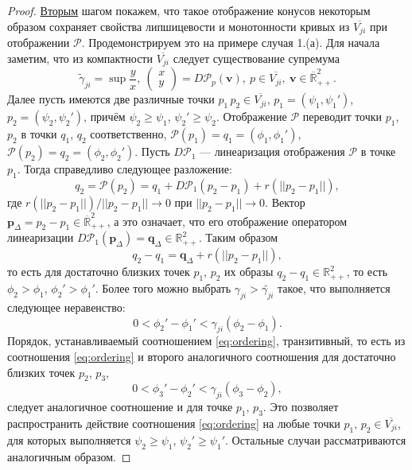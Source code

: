 \documentclass{article}
\begin{document}
\begin{proof}
\underline{Вторым} шагом покажем, что такое отображение конусов некоторым образом сохраняет свойства липшицевости и монотонности кривых из $\overline{V_{ji}}$ при отображении $\mathcal{P}$.
Продемонстрируем это на примере случая 1.(а).
Для начала заметим, что из компактности $\overline{V_{ji}}$ следует существование супремума
\begin{equation*}
	\widetilde{\gamma}_{ji} = \sup \dfrac{y}{x}, \ \begin{pmatrix} x \\ y \end{pmatrix} = D \mathcal{P}_p (\mathbf{v}), \ p \in \overline{V_{ji}}, \ \mathbf{v} \in \overline{\mathbb{R}}_{++}^2.
\end{equation*}
Далее пусть имеются две различные точки $p_1 \, p_2 \in \overline{V_{ji}}$, $p_1 = (\psi_1, \psi_1')$, $p_2 = (\psi_2, \psi_2')$, причём $\psi_2 \ge \psi_1$, $\psi_2' \ge \psi_2$.
Отображение $\mathcal{P}$ переводит точки $p_1$, $p_2$ в точки $q_1$, $q_2$ соответственно, $\mathcal{P}(p_1) = q_1 = (\phi_1, \phi_1')$, $\mathcal{P}(p_2) = q_2 = (\phi_2, \phi_2')$.
Пусть $D \mathcal{P}_1$ --- линеаризация отображения $\mathcal{P}$ в точке $p_1$.
Тогда справедливо следующее разложение:
\begin{equation}
	q_2 = \mathcal{P}(p_2) = q_1 + D \mathcal{P}_1 (p_2 - p_1) + r(||p_2 - p_1||),
\end{equation}
где $r(||p_2 - p_1||) / ||p_2 - p_1|| \to 0$ при $||p_2 - p_1|| \to 0.$
Вектор $\mathbf{p}_{\Delta} = p_2 - p_1 \in \overline{\mathbb{R}}_{++}^2$, а это означает, что его отображение оператором линеаризации $D \mathcal{P}_1 (\mathbf{p}_{\Delta}) = \mathbf{q}_{\Delta} \in \mathbb{R}_{++}^2$.
Таким образом
\begin{equation}
	q_2 - q_1 = \mathbf{q}_{\Delta} + r(||p_2 - p_1||),
\end{equation}
то есть для достаточно близких точек $p_1$, $p_2$ их образы $q_2 - q_1 \in \mathbb{R}_{++}^2$, то есть $\phi_2 > \phi_1$, $\phi_2' > \phi_1'$.
Более того можно выбрать $\gamma_{ji} > \widetilde{\gamma_{ji}}$ такое, что выполняется следующее неравенство:
\begin{equation}
	0 < \phi_2' - \phi_1' < \gamma_{ji} (\phi_2 - \phi_1).
\label{eq:ordering}
\end{equation}
Порядок, устанавливаемый соотношением \eqref{eq:ordering}, транзитивный, то есть из соотношения \eqref{eq:ordering} и второго аналогичного соотношения для достаточно близких точек $p_2$, $p_3$,
\begin{equation}
	0 < \phi_3' - \phi_2' < \gamma_{ji} (\phi_3 - \phi_2),
\end{equation}
следует аналогичное соотношение и для точке $p_1$, $p_3$.
Это позволяет распространить действие соотношения \eqref{eq:ordering} на любые точки $p_1, \, p_2 \in \overline{V_{ji}}$, для которых выполняется $\psi_2 \ge \psi_1$, $\psi_2' \ge \psi_1'$.
Остальные случаи рассматриваются аналогичным образом.


\end{proof}
\end{document}
